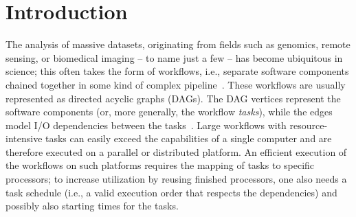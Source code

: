 \documentclass[conference]{IEEEtran}
\newcommand{\skug}[1]{{\color{blue}[SK: #1]}}
\renewcommand{\iec}{i.e., }
\begin{document}
\begin{abstract}

\end{abstract}


\section{Introduction} %

The analysis of massive datasets, originating from fields such as genomics, 
remote sensing, or biomedical imaging -- to name just a few -- has become ubiquitous in science;
this often takes the form of workflows, \iec separate software components chained together
in some kind of complex pipeline~\cite{DBLP:journals/dbsk/LeserHDEGHKKKKK21}.
These workflows are usually represented as directed acyclic graphs (DAGs).
The DAG vertices represent the software components (or, more generally, the workflow \emph{tasks}),
while the edges model I/O dependencies between the tasks~\cite{adhikari2019survey,liu2018survey}.
Large workflows with resource-intensive tasks can easily exceed the capabilities of a 
single computer and are therefore executed on a parallel or distributed platform.
An efficient execution of the workflows on such platforms requires the mapping of tasks
to specific processors; to increase utilization by reusing finished processors,
one also needs a task schedule (\iec a valid execution order that respects the dependencies)
and possibly also starting times for the tasks.
\end{document}
